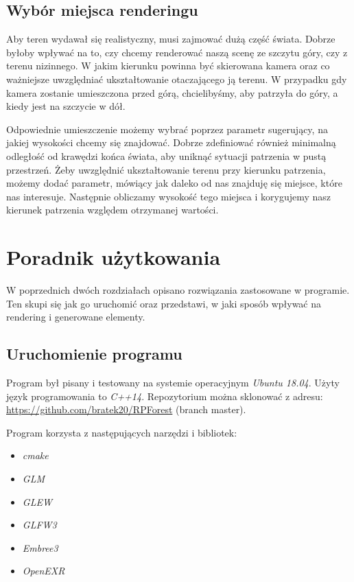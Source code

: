 \documentclass[inz,shortabstract]{iithesis}
\begin{document}
    \section{Wybór miejsca renderingu}
        Aby teren wydawał się realistyczny, musi zajmować dużą część świata. Dobrze byłoby wpływać na to, czy chcemy renderować naszą scenę ze szczytu góry, czy z terenu nizinnego. W jakim kierunku powinna być skierowana kamera oraz co ważniejsze uwzględniać ukształtowanie otaczającego ją terenu. W przypadku gdy kamera zostanie umieszczona przed górą, chcielibyśmy, aby patrzyła do góry, a kiedy jest na szczycie w dół. 
        
        Odpowiednie umieszczenie możemy wybrać poprzez parametr sugerujący, na jakiej wysokości chcemy się znajdować. Dobrze zdefiniować również minimalną odległość od krawędzi końca świata, aby uniknąć sytuacji patrzenia w pustą przestrzeń. Żeby uwzględnić ukształtowanie terenu przy kierunku patrzenia, możemy dodać parametr, mówiący jak daleko od nas znajduję się miejsce, które nas interesuje. Następnie obliczamy wysokość tego miejsca i korygujemy nasz kierunek patrzenia względem otrzymanej wartości.
        
\chapter{Poradnik użytkowania}
    W poprzednich dwóch rozdziałach opisano rozwiązania zastosowane w programie. Ten skupi się jak go uruchomić oraz przedstawi, w jaki sposób wpływać na rendering i generowane elementy.
    
    \section{Uruchomienie programu}
        Program był pisany i testowany na systemie operacyjnym \textit{Ubuntu 18.04}. Użyty język programowania to \textit{C++14}.
        Repozytorium można sklonować z adresu: \url{https://github.com/bratek20/RPForest} (branch master).
        
        Program korzysta z następujących narzędzi i bibliotek:
        \begin{itemize}
            \item \textit{cmake}
            \item \textit{GLM}
            \item \textit{GLEW}
            \item \textit{GLFW3}
            \item \textit{Embree3}
            \item \textit{OpenEXR}
        \end{itemize}
\end{document}
